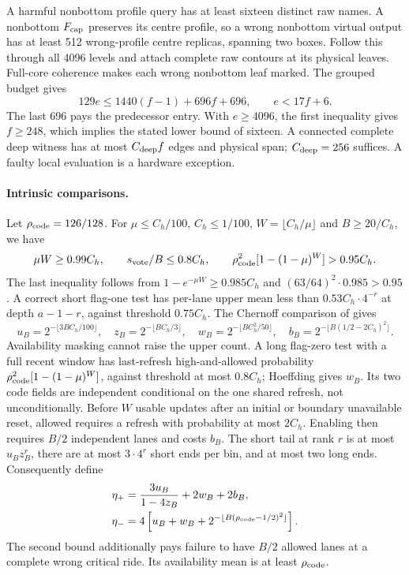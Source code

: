 A harmful nonbottom profile query has at least sixteen distinct raw
names. A nonbottom \(F_{\rm cap}\) preserves its centre profile, so a
wrong nonbottom virtual output has at least 512 wrong-profile centre
replicas, spanning two boxes. Follow this through all 4096 levels and
attach complete raw contours at its physical leaves. Full-core coherence
makes each wrong nonbottom leaf marked. The grouped budget gives
\[
 129e\le1440(f-1)+696f+696,\qquad e<17f+6.
\]
The last 696 pays the predecessor entry. With \(e\ge4096\), the
first inequality gives \(f\ge248\), which implies the stated lower
bound of sixteen. A connected complete deep witness has
at most \(C_{\rm deep}f\) edges and physical span;
\(C_{\rm deep}=256\) suffices. A faulty local evaluation is a hardware exception.

\paragraph{Intrinsic comparisons.}
Let \(\rho_{\rm code}=126/128\). For
\(\mu\le C_h/100\), \(C_h\le1/100\), \(W=\lfloor C_h/\mu\rfloor\) and
\(B\ge20/C_h\), we have
\[
 \mu W\ge0.99C_h,\qquad s_{\rm vote}/B\le0.8C_h,\qquad
 \rho_{\rm code}^2[1-(1-\mu)^W]>0.95C_h.
\]
The last inequality follows from
\(1-e^{-\mu W}\ge0.985C_h\) and
\((63/64)^2\cdot0.985>0.95\).
A correct short flag-one test has per-lane upper mean less than
\(0.53C_h\cdot4^{-r}\) at depth \(a-1-r\), against threshold \(0.75C_h\).
The Chernoff comparison of \cite[Lemmas~6.2 and~10.4]{DMNoise2026} gives
\[
 u_B=2^{-\lfloor3BC_h/100\rfloor},\quad
 z_B=2^{-\lfloor BC_h/3\rfloor},\quad
 w_B=2^{-\lfloor BC_h^2/50\rfloor},\quad
 b_B=2^{-\lfloor B(1/2-2C_h)^2\rfloor}.
\]
Availability masking cannot raise the upper count. A long flag-zero
test with a full recent window has last-refresh high-and-allowed
probability \(\rho_{\rm code}^2[1-(1-\mu)^W]\), against threshold at
most \(0.8C_h\); Hoeffding gives \(w_B\). Its two code fields are
independent conditional on the one shared refresh, not unconditionally.
Before \(W\) usable updates after an initial or boundary unavailable
reset, allowed requires a refresh with probability at most \(2C_h\).
Enabling then requires \(B/2\) independent lanes and costs \(b_B\).
The short tail at rank \(r\) is at most \(u_Bz_B^r\), there are at
most \(3\cdot4^r\) short ends per bin, and at most two long ends.
Consequently define
\begin{equation}\label{v:etas}
\begin{aligned}
 \eta_+&=\frac{3u_B}{1-4z_B}+2w_B+2b_B,\\
 \eta_-&=4\left[u_B+w_B+
 2^{-\lfloor B(\rho_{\rm code}-1/2)^2\rfloor}\right].
\end{aligned}
\end{equation}
The second bound additionally pays failure to have \(B/2\) allowed
lanes at a complete wrong critical ride. Its availability mean is at
least \(\rho_{\rm code}\).

